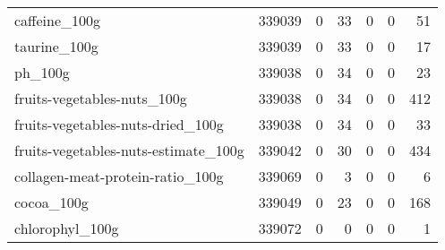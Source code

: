 \begin{tabular}{lrrrrrr}
caffeine\_100g                              &                                        339039 &                                         0 &                                            33 &                                         0 &                      0 &               51 \\
taurine\_100g                               &                                        339039 &                                         0 &                                            33 &                                         0 &                      0 &               17 \\
ph\_100g                                    &                                        339038 &                                         0 &                                            34 &                                         0 &                      0 &               23 \\
fruits-vegetables-nuts\_100g                &                                        339038 &                                         0 &                                            34 &                                         0 &                      0 &              412 \\
fruits-vegetables-nuts-dried\_100g          &                                        339038 &                                         0 &                                            34 &                                         0 &                      0 &               33 \\
fruits-vegetables-nuts-estimate\_100g       &                                        339042 &                                         0 &                                            30 &                                         0 &                      0 &              434 \\
collagen-meat-protein-ratio\_100g           &                                        339069 &                                         0 &                                             3 &                                         0 &                      0 &                6 \\
cocoa\_100g                                 &                                        339049 &                                         0 &                                            23 &                                         0 &                      0 &              168 \\
chlorophyl\_100g                            &                                        339072 &                                         0 &                                             0 &                                         0 &                      0 &                1 \\

\end{tabular}
